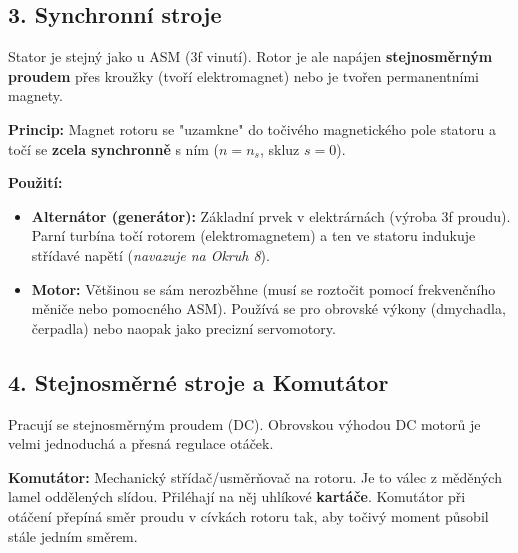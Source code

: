 \documentclass[a4paper,10pt]{article}
\begin{document}
\begin{vysvetlenibox}
\subsection*{3. Synchronní stroje}

Stator je stejný jako u ASM (3f vinutí).
Rotor je ale napájen \textbf{stejnosměrným proudem} přes kroužky (tvoří elektromagnet) nebo je tvořen permanentními magnety.

\textbf{Princip:} Magnet rotoru se "uzamkne" do točivého magnetického pole statoru a točí se \textbf{zcela synchronně} s ním ($n = n_s$, skluz $s = 0$).

\textbf{Použití:}
\begin{itemize}
  \item \textbf{Alternátor (generátor):} Základní prvek v elektrárnách (výroba 3f proudu). Parní turbína točí rotorem (elektromagnetem) a ten ve statoru indukuje střídavé napětí (\textit{navazuje na Okruh 8}).
  \item \textbf{Motor:} Většinou se sám nerozběhne (musí se roztočit pomocí frekvenčního měniče nebo pomocného ASM). Používá se pro obrovské výkony (dmychadla, čerpadla) nebo naopak jako precizní servomotory.
\end{itemize}

\subsection*{4. Stejnosměrné stroje a Komutátor}

Pracují se stejnosměrným proudem (DC). Obrovskou výhodou DC motorů je velmi jednoduchá a přesná regulace otáček.

\textbf{Komutátor:} Mechanický střídač/usměrňovač na rotoru. Je to válec z měděných lamel oddělených slídou. Přiléhají na něj uhlíkové \textbf{kartáče}. Komutátor při otáčení přepíná směr proudu v cívkách rotoru tak, aby točivý moment působil stále jedním směrem.

\begin{center}
\end{center}
\end{vysvetlenibox}
\end{document}
